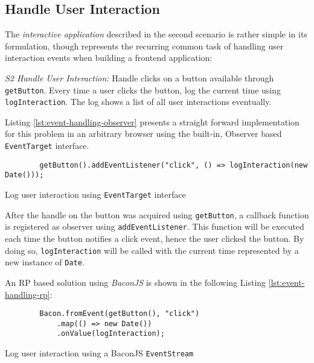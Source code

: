 \documentclass[12pt,a4paper]{article}
\begin{document}
\subsection{Handle User Interaction}

The \emph{interactive application} \cite{7827078} described in the second scenario is rather simple in its formulation, though represents the recurring common task of handling user interaction events when building a frontend application:

\begin{framed}
	\noindent\emph{S2 Handle User Interaction:} Handle clicks on a button available through \texttt{getButton}. Every time a user clicks the button, log the current time using \texttt{logInteraction}. The log shows a list of all user interactions eventually.
\end{framed}

Listing \ref{lst:event-handling-observer} presents a straight forward implementation for this problem in an arbitrary browser using the built-in, Observer based \texttt{EventTarget} interface.

\begin{listing}[ht]
	\begin{verbatim}
		getButton().addEventListener("click", () => logInteraction(new Date()));
	\end{verbatim}
	\caption{Log user interaction using \texttt{EventTarget} interface}
	\label{lst:event-handling-observer}
\end{listing}

After the handle on the button was acquired using \texttt{getButton}, a callback function is registered as observer using \texttt{addEventListener}. This function will be executed each time the button notifies a click event, hence the user clicked the button. By doing so, \texttt{logInteraction} will be called with the current time represented by a new instance of \texttt{Date}.

An RP based solution using \emph{BaconJS} is shown in the following Listing \ref{lst:event-handling-rp}:

\begin{listing}[H]
	\begin{verbatim}
		Bacon.fromEvent(getButton(), "click")
			.map(() => new Date())
			.onValue(logInteraction);
	\end{verbatim}
	\caption{Log user interaction using a BaconJS \texttt{EventStream}}
	\label{lst:event-handling-rp}
\end{listing}
\end{document}
